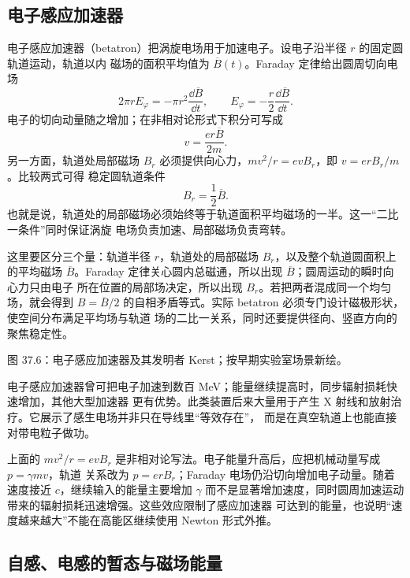 \vortexFieldDiagram

\subsection*{电子感应加速器}

电子感应加速器（betatron）把涡旋电场用于加速电子。设电子沿半径 $r$ 的固定圆轨道运动，轨道以内
磁场的面积平均值为 $\overline B(t)$。Faraday 定律给出圆周切向电场
\begin{equation}
  2\pi rE_\varphi=-\pi r^2\frac{\dd\overline B}{\dd t},
  \qquad
  E_\varphi=-\frac r2\frac{\dd\overline B}{\dd t}.
\end{equation}
电子的切向动量随之增加；在非相对论形式下积分可写成
\begin{equation}
  v=\frac{er\overline B}{2m}.
\end{equation}
另一方面，轨道处局部磁场 $B_r$ 必须提供向心力，$mv^2/r=evB_r$，即 $v=erB_r/m$。比较两式可得
稳定圆轨道条件
\begin{equation}
  \boxed{B_r=\frac12\overline B}.
\end{equation}
也就是说，轨道处的局部磁场必须始终等于轨道面积平均磁场的一半。这一“二比一条件”同时保证涡旋
电场负责加速、局部磁场负责弯转。

这里要区分三个量：轨道半径 $r$，轨道处的局部磁场 $B_r$，以及整个轨道圆面积上的平均磁场
$\overline B$。Faraday 定律关心圆内总磁通，所以出现 $\overline B$；圆周运动的瞬时向心力只由电子
所在位置的局部场决定，所以出现 $B_r$。若把两者混成同一个均匀场，就会得到
$B=\overline B/2$ 的自相矛盾等式。实际 betatron 必须专门设计磁极形状，使空间分布满足平均场与轨道
场的二比一关系，同时还要提供径向、竖直方向的聚焦稳定性。

{图 37.6：电子感应加速器及其发明者 Kerst；按早期实验室场景新绘。}

电子感应加速器曾可把电子加速到数百 MeV；能量继续提高时，同步辐射损耗快速增加，其他大型加速器
更有优势。此类装置后来大量用于产生 X 射线和放射治疗。它展示了感生电场并非只在导线里“等效存在”，
而是在真空轨道上也能直接对带电粒子做功。

上面的 $mv^2/r=evB_r$ 是非相对论写法。电子能量升高后，应把机械动量写成 $p=\gamma mv$，轨道
关系改为 $p=erB_r$；Faraday 电场仍沿切向增加电子动量。随着速度接近 $c$，继续输入的能量主要增加
$\gamma$ 而不是显著增加速度，同时圆周加速运动带来的辐射损耗迅速增强。这些效应限制了感应加速器
可达到的能量，也说明“速度越来越大”不能在高能区继续使用 Newton 形式外推。

\subsection*{自感、电感的暂态与磁场能量}


